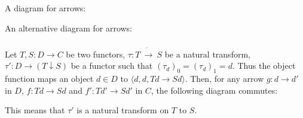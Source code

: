 \documentclass[luatex]{article}
\begin{document}
A diagram for arrows:

\begin{center}
\end{center}

An alternative diagram for arrows:

\begin{center}
\end{center}

\subsubsection{}

\showArt

Let $T, S : D \rightarrow C$ be two functors, $\tau : T\ \dot{\rightarrow}\ S$ be a natural transform, $\tau' : D \rightarrow (T \downarrow S)$ be a functor such that $(\tau_d)_0 = (\tau_d)_1 = d$. Thus the object function maps an object $d \in D$ to $\langle d, d, Td \rightarrow Sd \rangle$. Then, for any arrow $g : d \rightarrow d'$ in $D$, $f : Td \rightarrow Sd$ and $f' : Td' \rightarrow Sd'$ in $C$, the following diagram commutes:

\begin{center}
\end{center}

This means that $\tau'$ is a natural transform on $T$ to $S$.

\subsubsection{}
\end{document}
